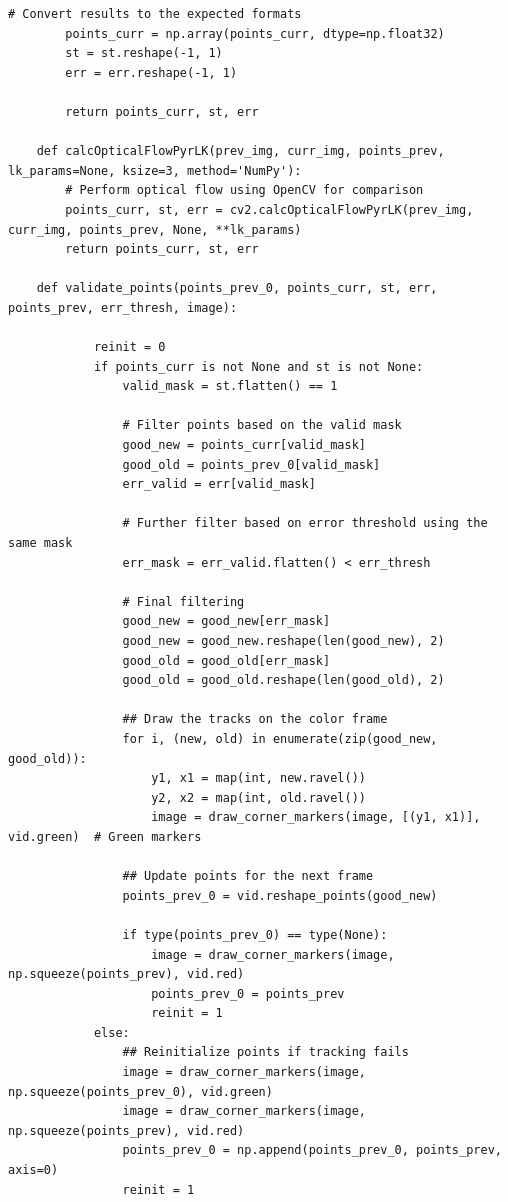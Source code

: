 \documentclass[11pt, conference, letterpaper]{IEEEtran}
\begin{document}
\begin{lstlisting}[style=python, caption={\texttt{lucas\_kanade.py}}, label={lst:lk}]
        # Convert results to the expected formats
        points_curr = np.array(points_curr, dtype=np.float32)
        st = st.reshape(-1, 1)
        err = err.reshape(-1, 1)
    
        return points_curr, st, err
    
    def calcOpticalFlowPyrLK(prev_img, curr_img, points_prev, lk_params=None, ksize=3, method='NumPy'): 
        # Perform optical flow using OpenCV for comparison
        points_curr, st, err = cv2.calcOpticalFlowPyrLK(prev_img, curr_img, points_prev, None, **lk_params)
        return points_curr, st, err
    
    def validate_points(points_prev_0, points_curr, st, err, points_prev, err_thresh, image):
            
            reinit = 0
            if points_curr is not None and st is not None:                
                valid_mask = st.flatten() == 1
                
                # Filter points based on the valid mask
                good_new = points_curr[valid_mask]
                good_old = points_prev_0[valid_mask]
                err_valid = err[valid_mask]
    
                # Further filter based on error threshold using the same mask
                err_mask = err_valid.flatten() < err_thresh
    
                # Final filtering
                good_new = good_new[err_mask]
                good_new = good_new.reshape(len(good_new), 2)
                good_old = good_old[err_mask]
                good_old = good_old.reshape(len(good_old), 2)
                
                ## Draw the tracks on the color frame
                for i, (new, old) in enumerate(zip(good_new, good_old)):
                    y1, x1 = map(int, new.ravel())
                    y2, x2 = map(int, old.ravel())
                    image = draw_corner_markers(image, [(y1, x1)], vid.green)  # Green markers
    
                ## Update points for the next frame
                points_prev_0 = vid.reshape_points(good_new)
                
                if type(points_prev_0) == type(None):
                    image = draw_corner_markers(image, np.squeeze(points_prev), vid.red)
                    points_prev_0 = points_prev
                    reinit = 1
            else:
                ## Reinitialize points if tracking fails
                image = draw_corner_markers(image, np.squeeze(points_prev_0), vid.green)
                image = draw_corner_markers(image, np.squeeze(points_prev), vid.red)
                points_prev_0 = np.append(points_prev_0, points_prev, axis=0)
                reinit = 1
            

\end{lstlisting}
\end{document}
